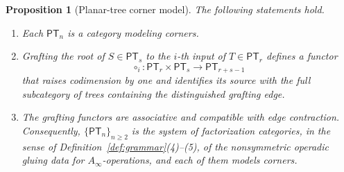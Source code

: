 \documentclass[11pt,letterpaper,twoside]{article}
\theoremstyle{plain}
\newtheorem{proposition}[theorem]{Proposition}
\theoremstyle{definition}
\theoremstyle{remark}
\newcommand{\Ainf}{A_\infty}
\begin{document}
\begin{proposition}[Planar-tree corner model]\label{prop:planar-corners}
The following statements hold.
\begin{enumerate}
\item Each \(\mathsf{PT}_n\) is a category modeling corners.
\item Grafting the root of \(S\in\mathsf{PT}_s\) to the \(i\)-th input of \(T\in\mathsf{PT}_r\) defines a functor
\[
 \circ_i:\mathsf{PT}_r\times\mathsf{PT}_s
 \longrightarrow\mathsf{PT}_{r+s-1}
\]
that raises codimension by one and identifies its source with the full subcategory of trees containing the distinguished grafting edge.
\item The grafting functors are associative and compatible with edge contraction.  Consequently, \(\{\mathsf{PT}_n\}_{n\geq2}\) is the system of factorization categories, in the sense of Definition~\ref{def:grammar}(4)--(5), of the nonsymmetric operadic gluing data for \(\Ainf\)-operations, and each of them models corners.
\end{enumerate}
\end{proposition}
\end{document}
